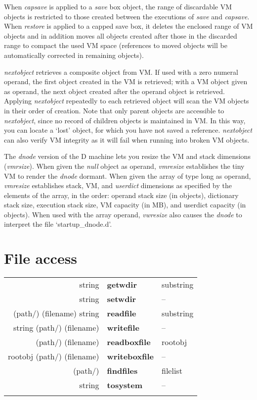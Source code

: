 When \emph{capsave} is applied to a \emph{save} box object, the range of discardable VM objects is restricted to those created between the executions of \emph{save} and \emph{capsave}. When \emph{restore} is applied to a capped save box, it deletes the enclosed range of VM objects and in addition moves all objects created after those in the discarded range to compact the used VM space (references to moved objects will be automatically corrected in remaining objects).

\emph{nextobject} retrieves a composite object from VM. If used with a zero numeral operand, the first object created in the VM is retrieved; with a VM object given as operand, the next object created after the operand object is retrieved. Applying \emph{nextobject} repeatedly to each retrieved object will scan the VM objects in their order of creation. Note that only parent objects are accessible to \emph{nextobject}, since no record of children objects is maintained in VM. In this way, you can locate a `lost' object, for which you have not saved a reference. \emph{nextobject} can also verify VM integrity as it will fail when running into broken VM objects.

The \emph{dnode} version of the D machine lets you resize the VM and stack dimensions (\emph{vmrsize}). When given the \emph{null} object as operand, \emph{vmresize} establishes the tiny VM to render the \emph{dnode} dormant. When given the array of type long as operand, \emph{vmresize} establishes stack, VM, and \emph{userdict} dimensions as specified by the elements of the array, in the order: operand stack size (in objects), dictionary stack size, execution stack size, VM capacity (in MB), and userdict capacity (in objects). When used with the array operand, \emph{vwresize} also causes the \emph{dnode} to interpret the file `startup\_dnode.d'. 
 

\section{File access}

\begin{tabular}{>{\sffamily}r>{\sffamily\bfseries}l>{\sffamily}l}
string & getwdir & substring\\
string & setwdir & --\\
(path/) (filename) string & readfile & substring\\
string (path/) (filename) & writefile & --\\
(path/) (filename) & readboxfile & rootobj\\
rootobj (path/) (filename) & writeboxfile & --\\
(path/) & findfiles & filelist\\
string & tosystem & --\\\\
\end{tabular}

